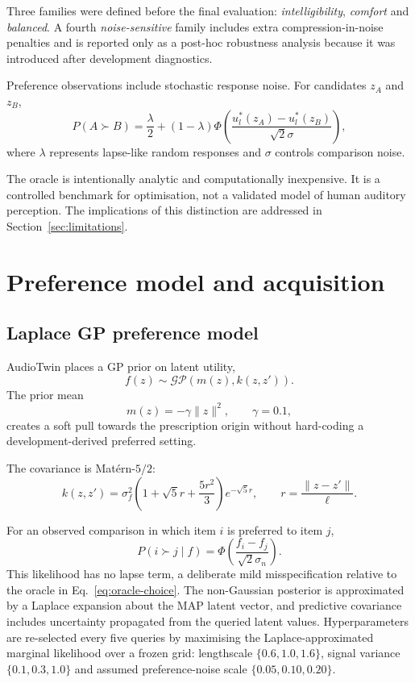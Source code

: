 \documentclass[preprint,12pt]{elsarticle}
\begin{document}
Three families were defined before the final evaluation: \emph{intelligibility}, \emph{comfort} and \emph{balanced}. A fourth \emph{noise-sensitive} family includes extra compression-in-noise penalties and is reported only as a post-hoc robustness analysis because it was introduced after development diagnostics.

Preference observations include stochastic response noise. For candidates $z_A$ and $z_B$,
\begin{equation}
 P(A\succ B)=\frac{\lambda}{2}+(1-\lambda)\Phi\left(\frac{u_l^*(z_A)-u_l^*(z_B)}{\sqrt{2}\sigma}\right),
 \label{eq:oracle-choice}
\end{equation}
where $\lambda$ represents lapse-like random responses and $\sigma$ controls comparison noise.

The oracle is intentionally analytic and computationally inexpensive. It is a controlled benchmark for optimisation, not a validated model of human auditory perception. The implications of this distinction are addressed in Section~\ref{sec:limitations}.

\section{Preference model and acquisition}
\label{sec:model}

\subsection{Laplace GP preference model}

AudioTwin places a GP prior on latent utility,
\begin{equation}
 f(z)\sim\mathcal{GP}(m(z),k(z,z')).
\end{equation}
The prior mean
\begin{equation}
 m(z)=-\gamma\|z\|^2, \qquad \gamma=0.1,
\end{equation}
creates a soft pull towards the prescription origin without hard-coding a development-derived preferred setting.

The covariance is Mat\'ern-$5/2$:
\begin{equation}
 k(z,z')=\sigma_f^2\left(1+\sqrt{5}r+\frac{5r^2}{3}\right)e^{-\sqrt{5}r},
 \qquad r=\frac{\|z-z'\|}{\ell}.
 \label{eq:matern}
\end{equation}

For an observed comparison in which item $i$ is preferred to item $j$,
\begin{equation}
 P(i\succ j\mid f)=\Phi\left(\frac{f_i-f_j}{\sqrt{2}\sigma_n}\right).
 \label{eq:probit}
\end{equation}
This likelihood has no lapse term, a deliberate mild misspecification relative to the oracle in Eq.~\eqref{eq:oracle-choice}. The non-Gaussian posterior is approximated by a Laplace expansion about the MAP latent vector, and predictive covariance includes uncertainty propagated from the queried latent values. Hyperparameters are re-selected every five queries by maximising the Laplace-approximated marginal likelihood over a frozen grid: lengthscale $\{0.6,1.0,1.6\}$, signal variance $\{0.1,0.3,1.0\}$ and assumed preference-noise scale $\{0.05,0.10,0.20\}$.
\end{document}

